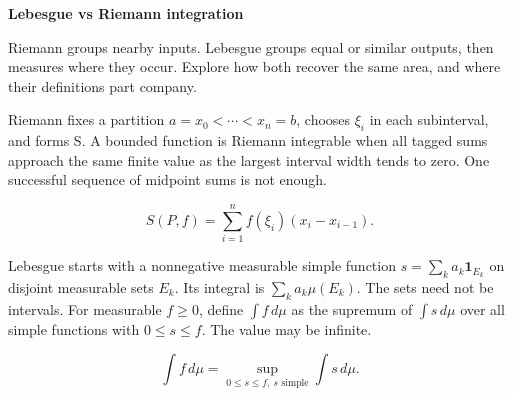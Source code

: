 \documentclass[11pt,a4paper]{article}
\newcommand{\topic}[1]{\vspace{6pt}{\large\bfseries #1}\par}
\newcommand{\pagetitle}[1]{{\LARGE\bfseries #1}\par\vspace{9pt}}
\begin{document}
\pagetitle{Lebesgue vs Riemann integration}

Riemann groups nearby inputs. Lebesgue groups equal or similar outputs, then measures where they occur. Explore how both recover the same area, and where their definitions part company.

\begin{center}\end{center}

\topic{What the pictures are actually saying}

Riemann fixes a partition \(a=x_0<\cdots<x_n=b\), chooses \(\xi_i\) in each subinterval, and forms S. A bounded function is Riemann integrable when all tagged sums approach the same finite value as the largest interval width tends to zero. One successful sequence of midpoint sums is not enough.

\[S(P,f)=\sum_{i=1}^n f(\xi_i)(x_i-x_{i-1}).\]

Lebesgue starts with a nonnegative measurable simple function \(s=\sum_k a_k\mathbf{1}_{E_k}\) on disjoint measurable sets \(E_k\). Its integral is \(\sum_k a_k\mu(E_k)\). The sets need not be intervals. For measurable \(f\ge0\), define \(\int f\,d\mu\) as the supremum of \(\int s\,d\mu\) over all simple functions with \(0\le s\le f\). The value may be infinite.

\[\int f\,d\mu=\sup_{0\le s\le f,\ s\text{ simple}}\int s\,d\mu.\]
\end{document}
